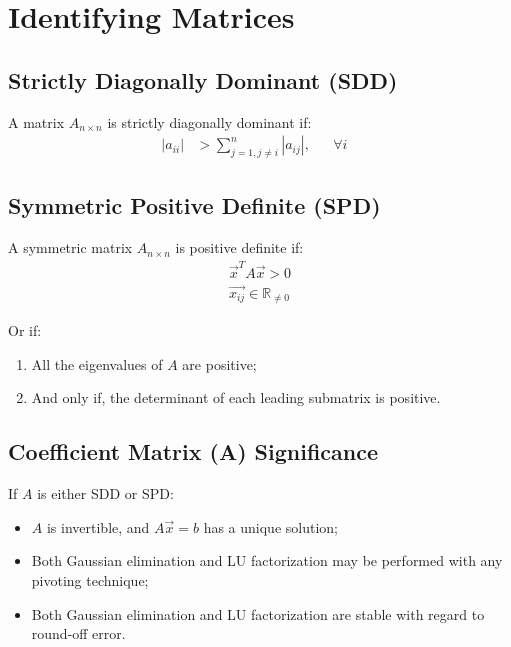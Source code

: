 \section{Identifying Matrices}

	\subsection{Strictly Diagonally Dominant (SDD)}

		A matrix $A_{n \times n}$ is strictly diagonally dominant if:
		\begin{align}
			|a_{ii}| &> \sum_{j = 1, j \neq i}^{n} |a_{ij}|,& &\forall i&
		\end{align}

	\subsection{Symmetric Positive Definite (SPD)}
		A symmetric matrix $A_{n \times n}$ is positive definite if:
		\begin{align}
			\vec{x}^{T} A \vec{x} > 0 \\
			\vec{x_{ij}} \in \mathbb{R}_{\neq 0}
		\end{align}

		Or if:
		\begin{enumerate}
			\item{All the eigenvalues of $A$ are positive;}
			\item{And only if, the determinant of each leading submatrix is positive.}
		\end{enumerate}

	\subsection{Coefficient Matrix (A) Significance}
		If $A$ is either SDD or SPD:
			\begin{itemize}
				\item{$A$ is invertible, and $A\vec{x} = b$ has a unique solution;}
				\item{Both Gaussian elimination and LU factorization may be performed with any pivoting technique;}
				\item{Both Gaussian elimination and LU factorization are stable with regard to round-off error.}
			\end{itemize}
